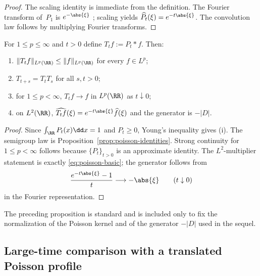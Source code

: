 \begin{proof}
The scaling identity is immediate from the definition.  The Fourier
transform of~$P_1$ is $e^{-\abs{\xi}}$
\cite[Chapter~III]{Stein1971}; scaling yields
$\widehat{P_t}(\xi)=e^{-t\abs{\xi}}$.  The convolution law follows by
multiplying Fourier transforms.
\end{proof}

\begin{proposition}%
\label{thm:poisson-semigroup-law}
For $1\le p\le\infty$ and $t>0$ define
$T_t f:=P_t*f$.  Then:
\begin{enumerate}[label=(\roman*)]
\item $\|T_t f\|_{L^p(\RR)}\le \|f\|_{L^p(\RR)}$ for every $f\in L^p$;
\item $T_{t+s}=T_tT_s$ for all $s,t>0$;
\item for $1\le p<\infty$, $T_t f\to f$ in $L^p(\RR)$ as $t\downarrow 0$;
\item on $L^2(\RR)$, $\widehat{T_t f}(\xi)=e^{-t\abs{\xi}}\widehat f(\xi)$
      and the generator is $-|D|$.
\end{enumerate}
\end{proposition}

\begin{proof}
Since $\int_{\RR}P_t(x)\dd x=1$ and $P_t\ge 0$, Young's inequality gives
(i).  The semigroup law is Proposition~\ref{prop:poisson-identities}.
Strong continuity for $1\le p<\infty$ follows because $\{P_t\}_{t>0}$ is
an approximate identity.  The $L^2$-multiplier statement is exactly
\eqref{eq:poisson-basic}; the generator follows from
\[
\frac{e^{-t\abs{\xi}}-1}{t}\longrightarrow -\abs{\xi}
\qquad(t\downarrow 0)
\]
in the Fourier representation.
\end{proof}

\begin{remark}
The preceding proposition is standard and is included only to fix the
normalization of the Poisson kernel and of the generator $-|D|$ used in
the sequel.
\end{remark}

\subsection{Large-time comparison with a translated Poisson profile}

